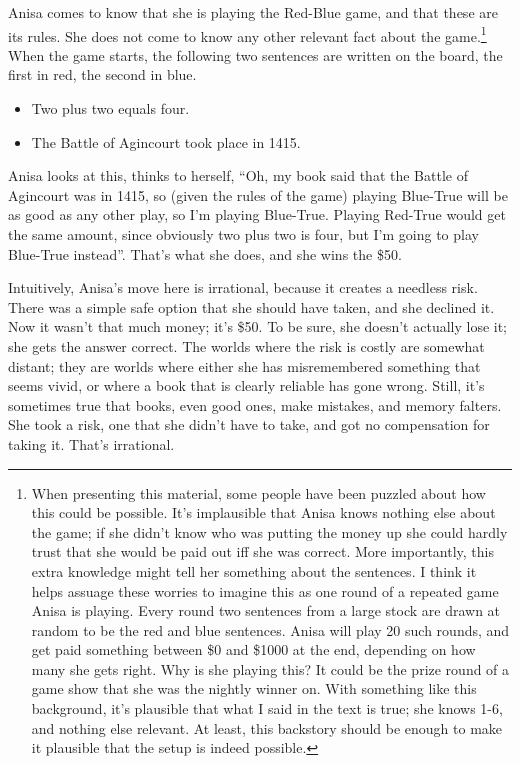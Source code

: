 \documentclass[
  10pt,
  letterpaper,
  twoside]{scrbook}
\providecommand{\tightlist}{%
  \setlength{\itemsep}{0pt}\setlength{\parskip}{0pt}}\usepackage{longtable,booktabs,array}
\begin{document}
Anisa comes to know that she is playing the Red-Blue game, and that
these are its rules. She does not come to know any other relevant fact
about the game.\footnote{When presenting this material, some people have
  been puzzled about how this could be possible. It's implausible that
  Anisa knows nothing else about the game; if she didn't know who was
  putting the money up she could hardly trust that she would be paid out
  iff she was correct. More importantly, this extra knowledge might tell
  her something about the sentences. I think it helps assuage these
  worries to imagine this as one round of a repeated game Anisa is
  playing. Every round two sentences from a large stock are drawn at
  random to be the red and blue sentences. Anisa will play 20 such
  rounds, and get paid something between \$0 and \$1000 at the end,
  depending on how many she gets right. Why is she playing this? It
  could be the prize round of a game show that she was the nightly
  winner on. With something like this background, it's plausible that
  what I said in the text is true; she knows 1-6, and nothing else
  relevant. At least, this backstory should be enough to make it
  plausible that the setup is indeed possible.} When the game starts,
the following two sentences are written on the board, the first in red,
the second in blue.

\begin{itemize}
\tightlist
\item
  Two plus two equals four.
\item
  The Battle of Agincourt took place in 1415.
\end{itemize}

Anisa looks at this, thinks to herself, ``Oh, my book said that the
Battle of Agincourt was in 1415, so (given the rules of the game)
playing Blue-True will be as good as any other play, so I'm playing
Blue-True. Playing Red-True would get the same amount, since obviously
two plus two is four, but I'm going to play Blue-True instead''. That's
what she does, and she wins the \$50.

Intuitively, Anisa's move here is irrational, because it creates a
needless risk. There was a simple safe option that she should have
taken, and she declined it. Now it wasn't that much money; it's \$50. To
be sure, she doesn't actually lose it; she gets the answer correct. The
worlds where the risk is costly are somewhat distant; they are worlds
where either she has misremembered something that seems vivid, or where
a book that is clearly reliable has gone wrong. Still, it's sometimes
true that books, even good ones, make mistakes, and memory falters. She
took a risk, one that she didn't have to take, and got no compensation
for taking it. That's irrational.
\end{document}

